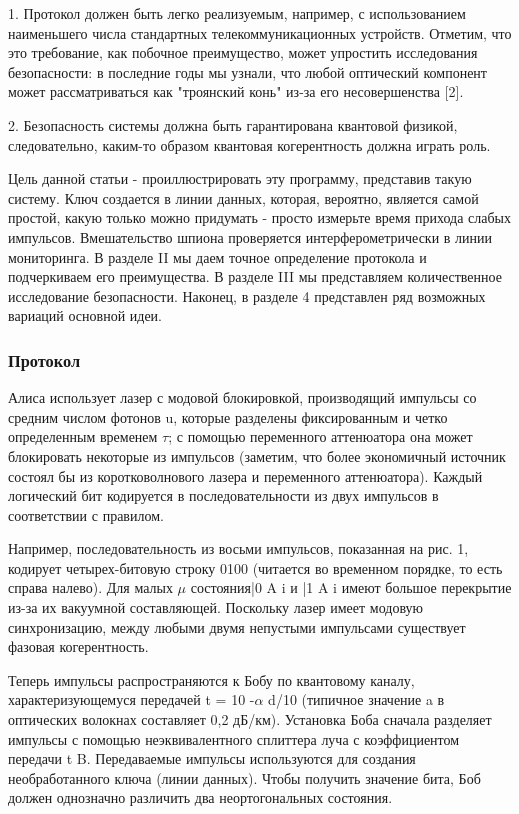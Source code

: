 1. Протокол должен быть легко реализуемым, например, с использованием наименьшего числа стандартных телекоммуникационных устройств. Отметим, что это требование, как побочное преимущество, может упростить исследования безопасности: в последние годы мы узнали, что любой оптический компонент может рассматриваться как "троянский конь" из-за его несовершенства [2].

2. Безопасность системы должна быть гарантирована квантовой физикой, следовательно, каким-то образом квантовая когерентность должна играть роль.

Цель данной статьи - проиллюстрировать эту программу, представив такую систему. Ключ создается в линии данных, которая, вероятно, является самой простой, какую только можно придумать - просто измерьте время прихода слабых импульсов. Вмешательство шпиона проверяется интерферометрически в линии мониторинга. В разделе II мы даем точное определение протокола и подчеркиваем его преимущества. В разделе III мы представляем количественное исследование безопасности. Наконец, в разделе 4 представлен ряд возможных вариаций основной идеи.


\subsubsection{Протокол}

Алиса использует лазер с модовой блокировкой, производящий импульсы со средним числом фотонов u, которые разделены фиксированным и четко определенным временем $\tau$; с помощью переменного аттенюатора она может блокировать некоторые из импульсов (заметим, что более экономичный источник состоял бы из коротковолнового лазера и переменного аттенюатора). Каждый логический бит кодируется в последовательности из двух импульсов в соответствии с правилом.

Например, последовательность из восьми импульсов, показанная на рис. 1, кодирует четырех-битовую строку 0100 (читается во временном порядке, то есть справа налево). Для малых $\mu$ состояния|0 A i и |1 A i имеют большое перекрытие из-за их вакуумной составляющей. Поскольку лазер имеет модовую синхронизацию, между любыми двумя непустыми импульсами существует фазовая когерентность.

Теперь импульсы распространяются к Бобу по квантовому каналу, характеризующемуся передачей t = 10 -$\alpha$ d/10 (типичное значение a в оптических волокнах составляет 0,2 дБ/км).
Установка Боба сначала разделяет импульсы с помощью неэквивалентного сплиттера луча с коэффициентом передачи t B. Передаваемые импульсы используются для создания необработанного ключа (линии данных). Чтобы получить значение бита, Боб должен однозначно различить два неортогональных состояния.

